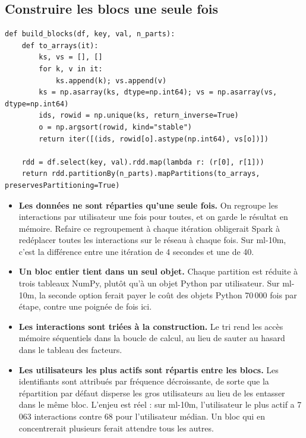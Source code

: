 \documentclass[11pt,a4paper]{article}
\begin{document}
\subsection{Construire les blocs une seule fois}

\begin{lstlisting}[caption={\texttt{eals\_rdd.build\_blocks} - un élément RDD par
partition, contenant le bloc sous forme de tableaux NumPy.},label={lst:blocks}]
def build_blocks(df, key, val, n_parts):
    def to_arrays(it):
        ks, vs = [], []
        for k, v in it:
            ks.append(k); vs.append(v)
        ks = np.asarray(ks, dtype=np.int64); vs = np.asarray(vs, dtype=np.int64)
        ids, rowid = np.unique(ks, return_inverse=True)
        o = np.argsort(rowid, kind="stable")
        return iter([(ids, rowid[o].astype(np.int64), vs[o])])

    rdd = df.select(key, val).rdd.map(lambda r: (r[0], r[1]))
    return rdd.partitionBy(n_parts).mapPartitions(to_arrays, preservesPartitioning=True)
\end{lstlisting}

\begin{itemize}\itemsep3pt
\item \textbf{Les données ne sont réparties qu'une seule fois.} On regroupe les
interactions par utilisateur une fois pour toutes, et on garde le résultat en mémoire.
Refaire ce regroupement à chaque itération obligerait Spark à redéplacer toutes les
interactions sur le réseau à chaque fois. Sur ml-10m, c'est la différence entre une
itération de 4 secondes et une de 40.
\item \textbf{Un bloc entier tient dans un seul objet.} Chaque partition est réduite à
trois tableaux NumPy, plutôt qu'à un objet Python par utilisateur. Sur ml-10m, la
seconde option ferait payer le coût des objets Python 70\,000 fois par étape, contre une
poignée de fois ici.
\item \textbf{Les interactions sont triées à la construction.} Le tri rend les accès
mémoire séquentiels dans la boucle de calcul, au lieu de sauter au hasard dans le
tableau des facteurs.
\item \textbf{Les utilisateurs les plus actifs sont répartis entre les blocs.} Les
identifiants sont attribués par fréquence décroissante, de sorte que la répartition par
défaut disperse les gros utilisateurs au lieu de les entasser dans le même bloc.
L'enjeu est réel : sur ml-10m, l'utilisateur le plus actif a 7\,063 interactions contre
68 pour l'utilisateur médian. Un bloc qui en concentrerait plusieurs ferait attendre
tous les autres.
\end{itemize}
\end{document}

